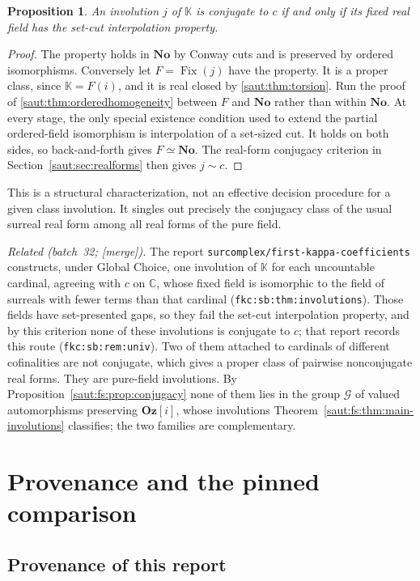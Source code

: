 \documentclass[11pt]{article}
\newtheorem{proposition}[theorem]{Proposition}
\theoremstyle{definition}
\theoremstyle{remark}
\newcommand{\No}{\mathbf{No}}
\newcommand{\C}{\mathbb C}
\newcommand{\K}{\mathbb K}
\newcommand{\Fix}{\operatorname{Fix}}
\newcommand{\repo}[1]{\nolinkurl{#1}}%
\newcommand{\lbl}[1]{\nolinkurl{#1}}%
\newcommand{\Oz}{\mathbf{Oz}}
\newcommand{\mergetag}{\textup{[merge]}}
\numberwithin{equation}{section}
\begin{document}
\begin{proposition}\label{saut:prop:conjugacycriterion}
An involution $j$ of $\K$ is conjugate to $c$ if and only if its fixed real
field has the set-cut interpolation property.
\end{proposition}
\begin{proof}
The property holds in $\No$ by Conway cuts and is preserved by ordered
isomorphisms. Conversely let $F=\Fix(j)$ have the property. It is a proper
class, since $\K=F(i)$, and it is real closed by
\cref{saut:thm:torsion}. Run the proof of \cref{saut:thm:orderedhomogeneity} between
$F$ and $\No$ rather than within $\No$. At every stage, the only special
existence condition used to extend the partial ordered-field isomorphism
is interpolation of a set-sized cut. It holds on both sides, so
back-and-forth gives $F\simeq\No$. The real-form conjugacy criterion in
Section~\ref{saut:sec:realforms} then gives $j\sim c$.
\end{proof}

This is a structural characterization, not an effective decision procedure
for a given class involution. It singles out precisely the conjugacy class
of the usual surreal real form among all real forms of the pure field.

\emph{Related (batch~32; \mergetag).} The report
\repo{surcomplex/first-kappa-coefficients} constructs, under Global Choice,
one involution of $\K$ for each uncountable cardinal, agreeing with $c$ on
$\C$, whose fixed field is isomorphic to the field of surreals with fewer
terms than that cardinal (\lbl{fkc:sb:thm:involutions}). Those fields have
set-presented gaps, so they fail the set-cut interpolation property, and by
this criterion none of these involutions is conjugate to $c$; that report
records this route (\lbl{fkc:sb:rem:univ}). Two of them attached to
cardinals of different cofinalities are not conjugate, which gives a proper
class of pairwise nonconjugate real forms. They are pure-field involutions.
By Proposition~\ref{saut:fs:prop:conjugacy} none of them lies in the group
$\mathcal G$ of valued automorphisms preserving $\Oz[i]$, whose involutions
Theorem~\ref{saut:fs:thm:main-involutions} classifies; the two families are
complementary.

\section{Provenance and the pinned comparison}\label{saut:app:provenance}
\RaggedRight

\subsection{Provenance of this report}
\end{document}
